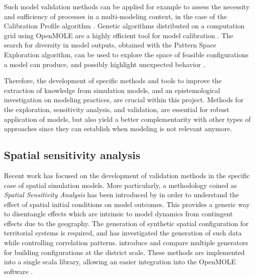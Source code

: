 Such model validation methods can be applied for example to assess the necessity and sufficiency of processes in a multi-modeling context, in the case of the Calibration Profile algorithm \cite{reuillon2015new}. Genetic algorithms distributed on a computation grid using OpenMOLE are a highly efficient tool for model calibration \cite{schmitt2015half}. The search for diversity in model outputs, obtained with the Pattern Space Exploration algorithm, can be used to explore the space of feasible configurations a model can produce, and possibly highlight unexpected behavior \cite{cherel2015beyond}.


Therefore, the development of specific methods and tools to improve the extraction of knowledge from simulation models, and an epistemological investigation on modeling practices, are crucial within this project. Methods for the exploration, sensitivity analysis, and validation, are essential for robust application of models, but also yield a better complementarity with other types of approaches since they can establish when modeling is not relevant anymore.


\subsection{Spatial sensitivity analysis}

Recent work has focused on the development of validation methods in the specific case of spatial simulation models. More particularly, a methodology coined as \emph{Spatial Sensitivity Analysis} has been introduced by \cite{raimbault2019space} in order to understand the effect of spatial initial conditions on model outcomes. This provides a generic way to disentangle effects which are intrinsic to model dynamics from contingent effects due to the geography. The generation of synthetic spatial configuration for territorial systems is required, and \cite{raimbault2019second} has investigated the generation of such data while controlling correlation patterns. \cite{raimbault2019generating} introduce and compare multiple generators for building configurations at the district scale. These methods are implemented into a single scala library, allowing an easier integration into the OpenMOLE software \cite{raimbault2020scala}.

\subsection{}


